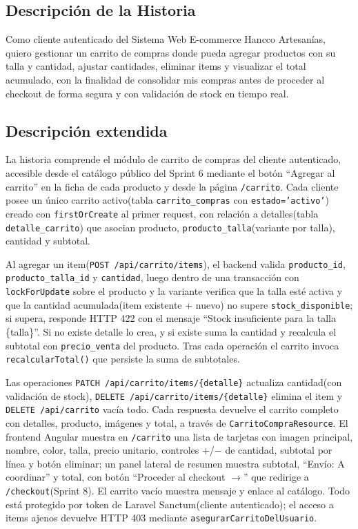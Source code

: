 \documentclass[12pt,a4paper]{article}
\begin{document}
\subsection*{Descripción de la Historia}

Como cliente autenticado del Sistema Web E-commerce Hancco Artesanías, quiero gestionar un carrito de compras donde pueda agregar productos con su talla y cantidad, ajustar cantidades, eliminar items y visualizar el total acumulado, con la finalidad de consolidar mis compras antes de proceder al checkout de forma segura y con validación de stock en tiempo real.

\subsection*{Descripción extendida}

La historia comprende el módulo de carrito de compras del cliente autenticado, accesible desde el catálogo público del Sprint 6 mediante el botón ``Agregar al carrito'' en la ficha de cada producto y desde la página \texttt{/carrito}. Cada cliente posee un único carrito activo(tabla \texttt{carrito\_compras} con \texttt{estado='activo'}) creado con \texttt{firstOrCreate} al primer request, con relación a detalles(tabla \texttt{detalle\_carrito}) que asocian producto, \texttt{producto\_talla}(variante por talla), cantidad y subtotal.

Al agregar un item(\texttt{POST /api/carrito/items}), el backend valida \texttt{producto\_id}, \texttt{producto\_talla\_id} y \texttt{cantidad}, luego dentro de una transacción con \texttt{lockForUpdate} sobre el producto y la variante verifica que la talla esté activa y que la cantidad acumulada(item existente + nuevo) no supere \texttt{stock\_disponible}; si supera, responde HTTP 422 con el mensaje ``Stock insuficiente para la talla \{talla\}''. Si no existe detalle lo crea, y si existe suma la cantidad y recalcula el subtotal con \texttt{precio\_venta} del producto. Tras cada operación el carrito invoca \texttt{recalcularTotal()} que persiste la suma de subtotales.

Las operaciones \texttt{PATCH /api/carrito/items/\{detalle\}} actualiza cantidad(con validación de stock), \texttt{DELETE /api/carrito/items/\{detalle\}} elimina el item y \texttt{DELETE /api/carrito} vacía todo. Cada respuesta devuelve el carrito completo con detalles, producto, imágenes y total, a través de \texttt{CarritoCompraResource}. El frontend Angular muestra en \texttt{/carrito} una lista de tarjetas con imagen principal, nombre, color, talla, precio unitario, controles +/− de cantidad, subtotal por línea y botón eliminar; un panel lateral de resumen muestra subtotal, ``Envío: A coordinar'' y total, con botón ``Proceder al checkout $\rightarrow$'' que redirige a \texttt{/checkout}(Sprint 8). El carrito vacío muestra mensaje y enlace al catálogo. Todo está protegido por token de Laravel Sanctum(cliente autenticado); el acceso a items ajenos devuelve HTTP 403 mediante \texttt{asegurarCarritoDelUsuario}.
\end{document}
